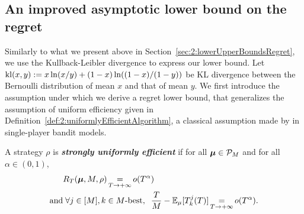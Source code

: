 \subsection{An improved asymptotic lower bound on the regret}
\label{sub:5:betterLowerBound}

Similarly to what we present above in Section~\ref{sec:2:lowerUpperBoundsRegret},
we use the Kullback-Leibler divergence to express our lower bound.
Let $\mathrm{kl}(x,y) := x\ln(x/y) + (1-x)\ln((1-x)/(1-y))$ be KL divergence between the Bernoulli distribution of mean $x$ and that of mean $y$.
%
We first introduce the assumption under which we derive a regret lower bound, that generalizes the assumption of uniform efficiency given in Definition~\ref{def:2:uniformlyEfficientAlgorithm},
a classical assumption made by \cite{LaiRobbins85} in single-player bandit models.

\begin{definition}\label{def:5:DecentralizedUniformEfficiency}
  A strategy $\rho$  is \emph{\textbf{strongly uniformly efficient}} if for all $\boldsymbol{\mu} \in \mathcal{P}_M$ and for all $\alpha \in (0,1)$,
  \begin{align}
    & R_T(\boldsymbol{\mu},M,\rho) \mathop{=}\limits_{T \to +\infty} o(T^\alpha) \\
    \text{and} & \;
    \forall j \in [M], k \in M\text{-}\mathrm{best}, \;\;
    \frac{T}{M}
    - \mathbb{E}_{\mu}[T^j_k(T)] \mathop{=}\limits_{T \to +\infty} o(T^{\alpha}).
    \label{eq:5:SUE}
  \end{align}
\end{definition}


